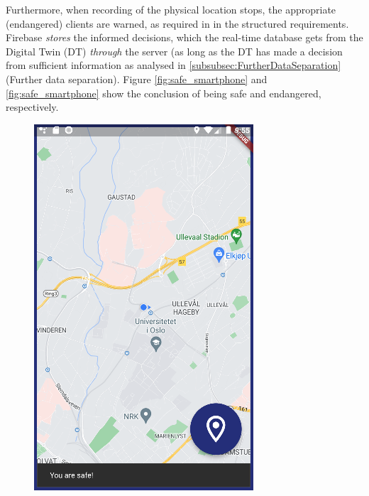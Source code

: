 \documentclass{article}
\begin{document}
Furthermore, when recording of the physical location stops, the appropriate (endangered) clients are warned, as required in in the structured requirements. Firebase \emph{stores} the informed decisions, which the real-time database gets from the Digital Twin (DT) \emph{through} the server (as long as the DT has made a decision from sufficient information as analysed in \ref{subsubsec:FurtherDataSeparation}(Further data separation). Figure \ref{fig:safe_smartphone} and \ref{fig:safe_smartphone} show the conclusion of being safe and endangered, respectively.

\begin{figure}[H]
    \centering
    \begin{minipage}[c]{0.40\linewidth}
        \includegraphics[width=\linewidth]{graphics/safe_smartphone.png}

\end{minipage}
\end{figure}
\end{document}
